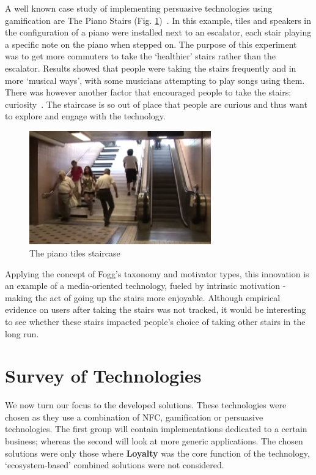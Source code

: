 A well known case study of implementing persuasive technologies using gamification are The Piano Stairs (Fig. \ref{ref:pianostaircase})~\cite{tieben2011curiosity}. In this example, tiles and speakers in the configuration of a piano were installed next to an escalator, each stair playing a specific note on the piano when stepped on. The purpose of this experiment was to get more commuters to take the `healthier' stairs rather than the escalator. Results showed that people were taking the stairs frequently and in more `musical ways', with some musicians attempting to play songs using them. There was however another factor that encouraged people to take the stairs: curiosity~\cite{tieben2011curiosity}. The staircase is so out of place that people are curious and thus want to explore and engage with the technology.

\begin{figure}[H]
  \centering
    \includegraphics[width=0.7\textwidth]{img/pianotiles.png}
      \caption{The piano tiles staircase}
      \label{ref:pianostaircase}
\end{figure}

Applying the concept of Fogg's taxonomy and motivator types, this innovation is an example of a media-oriented technology, fueled by intrinsic motivation - making the act of going up the stairs more enjoyable. Although empirical evidence on users after taking the stairs was not tracked, it would be interesting to see whether these stairs impacted people's choice of taking other stairs in the long run. 

\section{Survey of Technologies}
We now turn our focus to the developed solutions. These technologies were chosen as they use a combination of NFC, gamification or persuasive technologies. The first group will contain implementations dedicated to a certain business; whereas the second will look at more generic applications. The chosen solutions were only those where \textbf{Loyalty} was the core function of the technology, `ecosystem-based' combined solutions were not considered.

